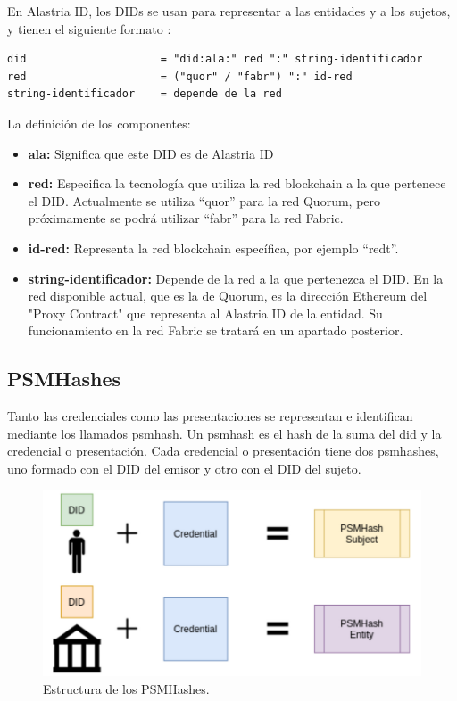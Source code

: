 En Alastria ID, los DIDs se usan para representar a las entidades y a los sujetos, y tienen el siguiente formato \cite{did-credentials-presentations}:
\begin{verbatim}
did                     = "did:ala:" red ":" string-identificador
red                     = ("quor" / "fabr") ":" id-red
string-identificador    = depende de la red
\end{verbatim}
La definición de los componentes:
\begin{itemize}
    \item \textbf{ala:} Significa que este DID es de Alastria ID
    \item \textbf{red:} Especifica la tecnología que utiliza la red blockchain a la que pertenece el DID. Actualmente se utiliza ``quor'' para la red Quorum, pero próximamente se podrá utilizar ``fabr'' para la red Fabric.
    \item \textbf{id-red:} Representa la red blockchain específica, por ejemplo ``redt''.
    \item \textbf{string-identificador:} Depende de la red a la que pertenezca el DID. En la red disponible actual, que es la de Quorum, es la dirección Ethereum del "Proxy Contract" que representa al Alastria ID de la entidad. Su funcionamiento en la red Fabric se tratará en un apartado posterior.
\end{itemize}
\clearpage
\subsection{PSMHashes}
Tanto las credenciales como las presentaciones se representan e identifican mediante los llamados \acrshort{psmhash}. Un \acrshort{psmhash} es el hash de la suma del \acrshort{did} y la credencial o presentación. Cada credencial o presentación tiene dos \acrshort{psmhash}es, uno formado con el DID del emisor y otro con el DID del sujeto.
\begin{figure}[H]
\centerline{\includegraphics[scale=.7]{recursos/psmhashes.png}}
\caption{Estructura de los PSMHashes.}
\label{psmhashes}
\end{figure}
